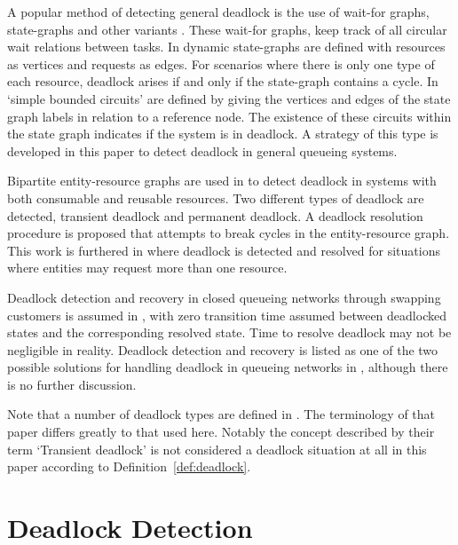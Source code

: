\documentclass{article}
\numberwithin{equation}{section}
\begin{document}
A popular method of detecting general deadlock is the use of wait-for graphs,
state-graphs and other variants \cite{cheng90, elmagarmid86, coffmanelphick71,
choetal95, deuermeyeretal97, venkateshetal98, venkateshsmith03,
venkateshsmith05, holt72}.
These wait-for graphs, keep track of all circular wait relations between tasks.
In \cite{coffmanelphick71} dynamic state-graphs are defined with resources as
vertices and requests as edges.
For scenarios where there is only one type of each resource, deadlock arises
if and only if the state-graph contains a cycle.
In \cite{choetal95} `simple bounded circuits' are defined by giving the
vertices and edges of the state graph labels in relation to a reference node.
The existence of these circuits within the state graph indicates if the system
is in deadlock.
A strategy of this type is developed in this paper to detect deadlock in
general queueing systems.

Bipartite entity-resource graphs are used in \cite{holt72, deuermeyeretal97,
venkateshsmith03} to detect deadlock in systems with
both consumable and reusable resources.
Two different types of deadlock are detected, transient deadlock and permanent
deadlock.
A deadlock resolution procedure is proposed that attempts to break cycles in the
entity-resource graph.
This work is furthered in \cite{venkateshetal98} where deadlock is detected
and resolved for situations where entities may request more than one resource.

Deadlock detection and recovery in closed queueing networks through swapping
customers is assumed in \cite{perrosetal88}, with zero transition time assumed
between deadlocked states and the corresponding resolved state.
Time to resolve deadlock may not be negligible in reality.
Deadlock detection and recovery is listed as one of the two possible solutions
for handling deadlock in queueing networks in \cite{akyildiz89}, although
there is no further discussion.

Note that a number of deadlock types are defined in \cite{venkateshetal98}.
The terminology of that paper differs greatly to that used here.
Notably the concept described by their term `Transient deadlock' is not
considered a deadlock situation at all in this paper according to
Definition~\ref{def:deadlock}.





\section{Deadlock Detection}\label{sec:detectingdeadlock}
\end{document}
